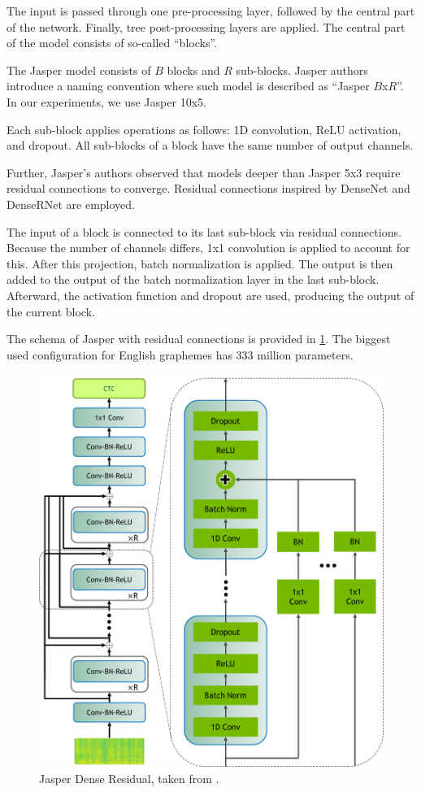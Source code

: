 The input is passed through one pre-processing layer, followed by the central part of the network. Finally, tree post-processing layers are applied. The central part of the model consists of so-called ``blocks''.

The Jasper model consists of $B$ blocks and $R$ sub-blocks. Jasper authors introduce a naming convention where such model is described as ``Jasper $B$x$R$''. In our experiments, we use Jasper 10x5.

Each sub-block applies operations as follows: 1D convolution, ReLU activation, and dropout. All sub-blocks of a block have the same number of output channels. 

Further, Jasper's authors observed that models deeper than Jasper 5x3 require residual connections to converge. Residual connections inspired by DenseNet  and DenseRNet  are employed.

The input of a block is connected to its last sub-block via residual connections. Because the number of channels differs, 1x1 convolution is applied to account for this. After this projection, batch normalization is applied. The output is then added to the output of the batch normalization layer in the last sub-block. Afterward, the activation function and dropout are used, producing the output of the current block.

The schema of Jasper with residual connections is provided in \cref{fig:jasper_dr}. The biggest used configuration for English graphemes has 333 million parameters.

\begin{figure}[]
	\centering
	\includegraphics[width=0.9\linewidth]{img/JasperVerticalDR4.png}
	\caption[Jasper Dense Residual architecture]{Jasper Dense Residual, taken from .}
	\label{fig:jasper_dr}
\end{figure}

